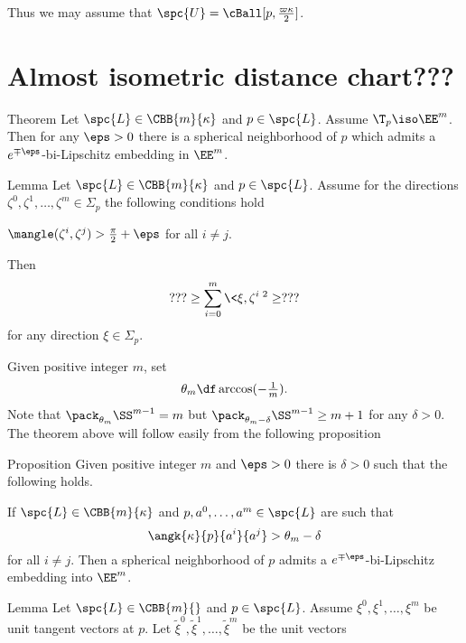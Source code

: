 Thus we may assume that $\spc{U}=\cBall[p,\tfrac{\varpi\kappa}{2}]$.














\section{Almost isometric distance chart???}

\begin{thm}{Theorem}
Let $\spc{L}\in\CBB{m}{\kappa}$ and $p\in\spc{L}$.
Assume $\T_p\iso\EE^m$.
Then for any $\eps>0$
there is a spherical neighborhood of $p$
which admits a $e^{\mp\eps}$-bi-Lipschitz embedding in $\EE^m$.
\end{thm}

\begin{thm}{Lemma}\label{lem:pack(S^m)+}
Let $\spc{L}\in\CBB{m}{\kappa}$ and $p\in\spc{L}$.
Assume for the directions $\zeta^0,\zeta^1,\dots,\zeta^m\in\Sigma_p$ the following conditions hold 
\begin{subthm}{}
$\mangle(\zeta^i,\zeta^j)>\tfrac\pi2+\eps$ for all $i\not=j$.
\end{subthm}
Then 
\[???\ge \sum_{i=0}^m\<\xi,\zeta^i\>^2\ge ???\]
for any direction $\xi\in \Sigma_p$.
\end{thm}


Given positive integer $m$, 
set 
\[\theta_m\df\arccos(-\tfrac1m).\]
Note that $\pack_{\theta_m}\SS^{m-1}=m$ but $\pack_{\theta_m-\delta}\SS^{m-1}\ge m+1$ for any $\delta>0$.
The theorem above will follow easily from the following proposition

\begin{thm}{Proposition}
Given positive integer $m$ and $\eps>0$ there is $\delta>0$ 
such that the following holds.

If $\spc{L}\in\CBB{m}{\kappa}$ and $p,a^0,\dots,a^m\in \spc{L}$ are such that
\[\angk{\kappa}{p}{a^i}{a^j}>\theta_m-\delta\]
for all $i\ne j$.
Then a spherical neighborhood of $p$ admits a $e^{\mp\eps}$-bi-Lipschitz embedding into $\EE^m$.
\end{thm}

\begin{thm}{Lemma}
Let $\spc{L}\in\CBB{m}{}$ and $p\in \spc{L}$.
Assume $\xi^0,\xi^1,\dots,\xi^m$ be unit tangent vectors at $p$.
Let $\tilde \xi^0,\tilde \xi^1,\dots,\tilde \xi^m$ be the unit vectors 
\end{thm}








